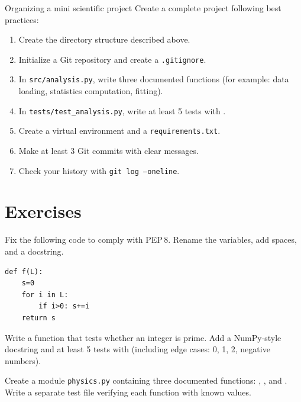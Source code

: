 \begin{projet}{Organizing a mini scientific project}
Create a complete project following best practices:
\begin{enumerate}
  \item Create the directory structure described above.
  \item Initialize a Git repository and create a \texttt{.gitignore}.
  \item In \texttt{src/analysis.py}, write three documented functions
    (for example: data loading, statistics computation, fitting).
  \item In \texttt{tests/test\_analysis.py}, write at least 5 tests with
    .
  \item Create a virtual environment and a \texttt{requirements.txt}.
  \item Make at least 3 Git commits with clear messages.
  \item Check your history with \texttt{git log --oneline}.
\end{enumerate}
\end{projet}

\section{Exercises}

\begin{exercise}[$\star$]
Fix the following code to comply with PEP\,8. Rename the variables,
add spaces, and a docstring.
\begin{verbatim}
def f(L):
    s=0
    for i in L:
        if i>0: s+=i
    return s
\end{verbatim}
\end{exercise}

\begin{exercise}[$\star$]
Write a function  that tests whether an integer is prime.
Add a NumPy-style docstring and at least 5 tests with 
(including edge cases: 0, 1, 2, negative numbers).
\end{exercise}

\begin{exercise}[$\star\star$]
Create a module \texttt{physics.py} containing three documented functions:
, , and
. Write a separate test file verifying each
function with known values.
\end{exercise}

